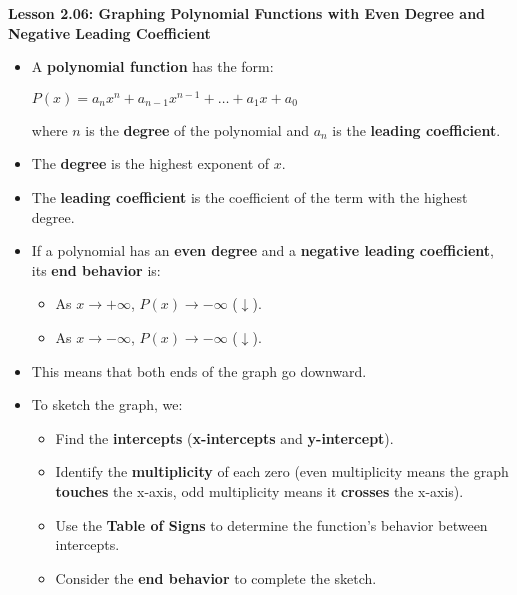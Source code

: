 \begin{center}
\textbf{Lesson 2.06: Graphing Polynomial Functions with Even Degree and Negative Leading Coefficient}
\end{center}

\vspace*{-1.5ex}

\begin{itemize}
    \item A \textbf{polynomial function} has the form:

 {\centering $
    P(x) = a_n x^n + a_{n-1} x^{n-1} + \dots + a_1 x + a_0
    $\par}
  
    where \( n \) is the \textbf{degree} of the polynomial and \( a_n \) is the \textbf{leading coefficient}.
    \item The \textbf{degree} is the highest exponent of \( x \).
    \item The \textbf{leading coefficient} is the coefficient of the term with the highest degree.
    \item If a polynomial has an \textbf{even degree} and a \textbf{negative leading coefficient}, its \textbf{end behavior} is:
    \begin{itemize}
        \item As \( x \to +\infty \), \( P(x) \to -\infty \) (\(\downarrow\)).
        \item As \( x \to -\infty \), \( P(x) \to -\infty \) (\(\downarrow\)).
    \end{itemize}
    \item This means that both ends of the graph go downward.
    \item To sketch the graph, we:
    \begin{itemize}
        \item Find the \textbf{intercepts} (\textbf{x-intercepts} and \textbf{y-intercept}).
        \item Identify the \textbf{multiplicity} of each zero (even multiplicity means the graph \textbf{touches} the x-axis, odd multiplicity means it \textbf{crosses} the x-axis).
        \item Use the \textbf{Table of Signs} to determine the function’s behavior between intercepts.
        \item Consider the \textbf{end behavior} to complete the sketch.
    \end{itemize}
\end{itemize}
